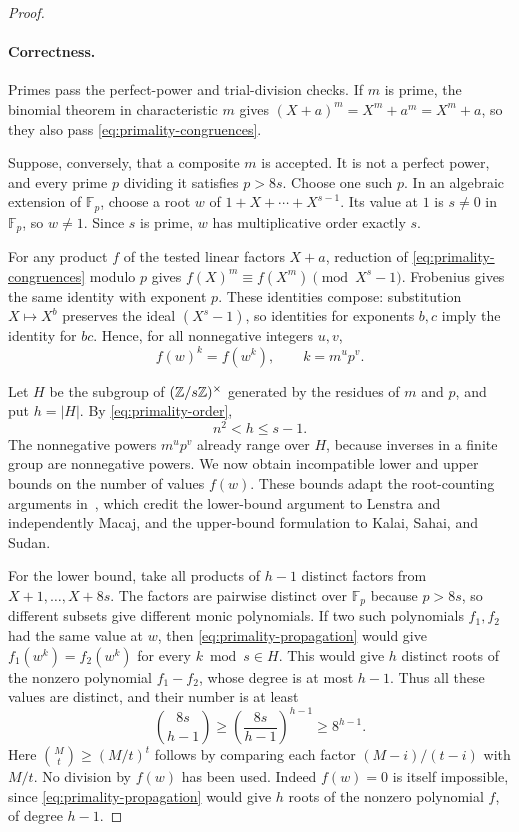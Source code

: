 \begin{proof}
\paragraph{Correctness.}
Primes pass the perfect-power and trial-division checks.  If $m$ is prime,
the binomial theorem in characteristic $m$ gives
$(X+a)^m=X^m+a^m=X^m+a$, so they also pass
\eqref{eq:primality-congruences}.

Suppose, conversely, that a composite $m$ is accepted.  It is not a perfect
power, and every prime $p$ dividing it satisfies $p>8s$.  Choose one such
$p$.  In an algebraic extension of $\mathbb F_p$, choose a root $w$ of
$1+X+\cdots+X^{s-1}$.  Its value at $1$ is $s\ne0$ in $\mathbb F_p$,
so $w\ne1$.  Since $s$ is prime, $w$ has multiplicative order exactly $s$.

For any product $f$ of the tested linear factors $X+a$, reduction of
\eqref{eq:primality-congruences} modulo $p$ gives
$f(X)^m\equiv f(X^m)\pmod{X^s-1}$.  Frobenius gives the same identity with
exponent $p$.  These identities compose: substitution $X\mapsto X^b$
preserves the ideal $(X^s-1)$, so identities for exponents $b,c$ imply the
identity for $bc$.  Hence, for all nonnegative integers $u,v$,
\begin{equation}\label{eq:primality-propagation}
 f(w)^k=f(w^k),\qquad k=m^u p^v.
\end{equation}

Let $H$ be the subgroup of $(\mathbb Z/s\mathbb Z)^\times$ generated by the residues
of $m$ and $p$, and put $h=|H|$.  By \eqref{eq:primality-order},
\[
 n^2<h\le s-1.
\]
The nonnegative powers $m^u p^v$ already range over $H$, because inverses
in a finite group are nonnegative powers.  We now obtain incompatible
lower and upper bounds on the number of values $f(w)$.
These bounds adapt the root-counting arguments
in~\cite[Lemmas~4.7--4.8 and their footnotes]{AKS}, which credit the
lower-bound argument to Lenstra and independently Macaj, and the
upper-bound formulation to Kalai, Sahai, and Sudan.

For the lower bound, take all products of $h-1$ distinct factors from
$X+1,\ldots,X+8s$.  The factors are pairwise distinct over $\mathbb F_p$
because $p>8s$, so different subsets give different monic polynomials.
If two such polynomials $f_1,f_2$ had the same value at $w$, then
\eqref{eq:primality-propagation} would give
$f_1(w^k)=f_2(w^k)$ for every $k\bmod s\in H$.  This would give $h$
distinct roots of the nonzero polynomial $f_1-f_2$, whose degree is at
most $h-1$.  Thus all these values are distinct, and their number is at least
\begin{equation}\label{eq:primality-lower}
 \binom{8s}{h-1}
 \ge\left(\frac{8s}{h-1}\right)^{h-1}
 \ge8^{h-1}.
\end{equation}
Here $\binom{M}{t}\ge(M/t)^t$ follows by comparing each factor
$(M-i)/(t-i)$ with $M/t$.  No division by $f(w)$ has been used.  Indeed
$f(w)=0$ is itself impossible, since \eqref{eq:primality-propagation}
would give $h$ roots of the nonzero polynomial $f$, of degree $h-1$.


\end{proof}
